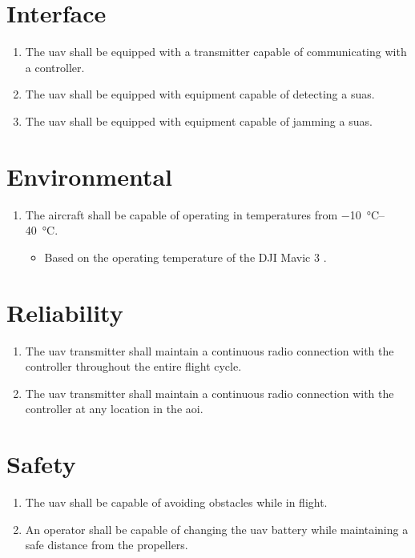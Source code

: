 \section{Interface}\label{sec:interface}

\begin{enumerate}
    \item The \acrshort{uav} shall be equipped with a transmitter capable of communicating with a controller.
    \item The \acrshort{uav} shall be equipped with equipment capable of detecting a \acrshort{suas}.
    \item The \acrshort{uav} shall be equipped with equipment capable of jamming a \acrshort{suas}.
\end{enumerate}

\section{Environmental}\label{sec:environmental}

\begin{enumerate}
    \item The aircraft shall be capable of operating in temperatures from \qtyrange{-10}{40}{\celsius}.
        \begin{itemize}
            \item Based on the operating temperature of the DJI Mavic 3 \citep{dji_mavic_3}.
        \end{itemize}
\end{enumerate}

\section{Reliability}\label{sec:reliability}

\begin{enumerate}
    \item The \acrshort{uav} transmitter shall maintain a continuous radio connection with the controller throughout the entire flight cycle.
    \item The \acrshort{uav} transmitter shall maintain a continuous radio connection with the controller at any location in the \acrshort{aoi}.
\end{enumerate}

\section{Safety}\label{sec:safety}

\begin{enumerate}
    \item The \acrshort{uav} shall be capable of avoiding obstacles while in flight.
    \item An operator shall be capable of changing the \acrshort{uav} battery while maintaining a safe distance from the propellers.
\end{enumerate}
